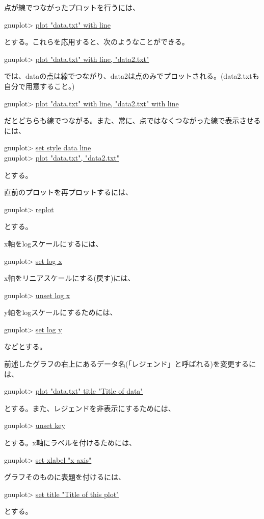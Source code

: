 {点が線でつながったプロットを行うには、
\begin{commandline2}
gnuplot> \underline{plot "data.txt" with line}
\end{commandline2} \noindent
とする。これらを応用すると、次のようなことができる。
\begin{commandline2}
gnuplot> \underline{plot "data.txt" with line, "data2.txt"}
\end{commandline2} \noindent
では、dataの点は線でつながり、data2は点のみでプロットされる。(data2.txtも自分で用意すること。)
\begin{commandline2}
gnuplot> \underline{plot "data.txt" with line, "data2.txt" with line}
\end{commandline2} \noindent
だとどちらも線でつながる。また、常に、点ではなくつながった線で表示させるには、
\begin{commandline2}
gnuplot> \underline{set style data line}\\
gnuplot> \underline{plot "data.txt", "data2.txt"}
\end{commandline2} \noindent
とする。

直前のプロットを再プロットするには、
\begin{commandline2}
gnuplot> \underline{replot}
\end{commandline2} \noindent
とする。

x軸をlogスケールにするには、
\begin{commandline2}
gnuplot> \underline{set log x}
\end{commandline2} \noindent
x軸をリニアスケールにする(戻す)には、
\begin{commandline2}
gnuplot> \underline{unset log x}
\end{commandline2} \noindent
y軸をlogスケールにするためには、
\begin{commandline2}
gnuplot> \underline{set log y}
\end{commandline2} \noindent
などとする。

前述したグラフの右上にあるデータ名(「レジェンド」と呼ばれる)を変更するには、
\begin{commandline2}
gnuplot> \underline{plot "data.txt" title "Title of data"}
\end{commandline2} \noindent
とする。また、レジェンドを非表示にするためには、
\begin{commandline2}
gnuplot> \underline{unset key}
\end{commandline2} \noindent
とする。x軸にラベルを付けるためには、
\begin{commandline2}
gnuplot> \underline{set xlabel "x axis"}
\end{commandline2} \noindent
グラフそのものに表題を付けるには、
\begin{commandline2}
gnuplot> \underline{set title "Title of this plot"}
\end{commandline2} \noindent
とする。

}
